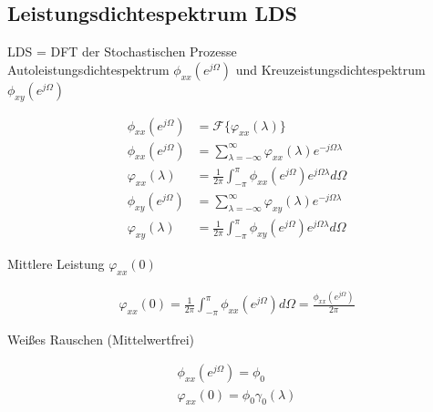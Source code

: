\documentclass[10pt,a4paper]{article}
\begin{document}
\subsection{Leistungsdichtespektrum LDS}
LDS = DFT der Stochastischen Prozesse \\
Autoleistungsdichtespektrum  $\phi_{xx}(e^{j\Omega})$ und Kreuzeistungsdichtespektrum $\phi_{xy}(e^{j\Omega})$
  \begin{mdframed}[style=exercise]
    \begin{align}
        \phi_{xx}(e^{j\Omega}) &= \mathcal{F}\{ \varphi_{xx}(\lambda)\} \\
        \phi_{xx}(e^{j\Omega}) &= \sum_{\lambda=-\infty}^{\infty} \varphi_{xx}(\lambda) e^{-j\Omega\lambda} \\
        \varphi_{xx}(\lambda) &= \frac{1}{2\pi} \displaystyle\int_{-\pi}^{\pi} \phi_{xx}(e^{j\Omega})e^{j\Omega\lambda}d\Omega \\
        \phi_{xy}(e^{j\Omega}) &= \sum_{\lambda=-\infty}^{\infty} \varphi_{xy}(\lambda) e^{-j\Omega\lambda} \\
        \varphi_{xy}(\lambda) &= \frac{1}{2\pi} \displaystyle\int_{-\pi}^{\pi} \phi_{xy}(e^{j\Omega})e^{j\Omega\lambda}d\Omega \end{align}
  \end{mdframed}
Mittlere Leistung $\varphi_{xx}(0)$
  \begin{mdframed}[style=exercise]
    \begin{align}
        \varphi_{xx}(0) = \frac{1}{2\pi} \displaystyle\int_{-\pi}^{\pi} \phi_{xx}(e^{j\Omega})d\Omega  = \frac{\phi_{xx}(e^{j\Omega})}{2\pi}
    \end{align}
  \end{mdframed}
Weißes Rauschen (Mittelwertfrei) 
  \begin{mdframed}[style=exercise]
    \begin{align}
        \phi_{xx}(e^{j\Omega}) = \phi_0\\
        \varphi_{xx}(0) = \phi_0 \gamma_0(\lambda)
    \end{align}
  \end{mdframed}
\end{document}

